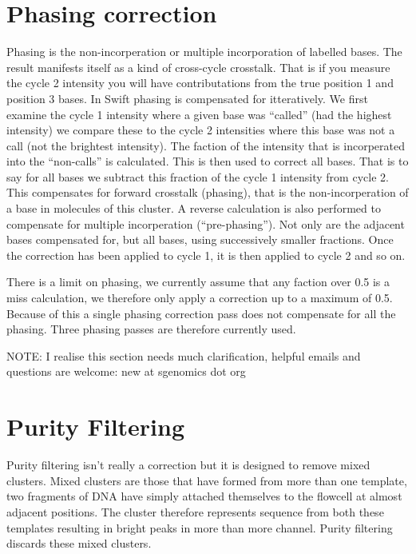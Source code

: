 \documentclass{report}
\begin{document}
\section{Phasing correction}

Phasing is the non-incorperation or multiple incorporation of labelled bases. The result manifests itself as a kind of cross-cycle crosstalk. That is if you measure the cycle 2 intensity you will have contributations from the true position 1 and position 3 bases. In Swift phasing is compensated for itteratively. We first examine the cycle 1 intensity where a given base was ``called'' (had the highest intensity) we compare these to the cycle 2 intensities where this base was not a call (not the brightest intensity). The faction of the intensity that is incorperated into the ``non-calls'' is calculated. This is then used to correct all bases. That is to say for all bases we subtract this fraction of the cycle 1 intensity from cycle 2. This compensates for forward crosstalk (phasing), that is the non-incorperation of a base in molecules of this cluster. A reverse calculation is also performed to compensate for multiple incorperation (``pre-phasing''). Not only are the adjacent bases compensated for, but all bases, using successively smaller fractions. Once the correction has been applied to cycle 1, it is then applied to cycle 2 and so on.

There is a limit on phasing, we currently assume that any faction over 0.5 is a miss calculation, we therefore only apply a correction up to a maximum of 0.5. Because of this a single phasing correction pass does not compensate for all the phasing. Three phasing passes are therefore currently used.

NOTE: I realise this section needs much clarification, helpful emails and questions are welcome: new at sgenomics dot org

\section{Purity Filtering}

Purity filtering isn't really a correction but it is designed to remove mixed clusters. Mixed clusters are those that have formed from more than one template, two fragments of DNA have simply attached themselves to the flowcell at almost adjacent positions. The cluster therefore represents sequence from both these templates resulting in bright peaks in more than more channel. Purity filtering discards these mixed clusters. 
\end{document}

